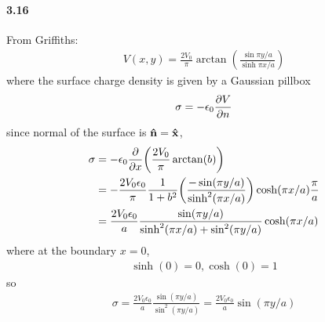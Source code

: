 \documentclass[../main.tex]{subfiles}
\begin{document}
\pagestyle{fancy}

\setcounter{section}{4}

\paragraph{3.16} 

From Griffiths:
\begin{align*}
    V(x,y) = \frac{2V_0}{\pi} \arctan(\frac{\sin\pi y/a}{\sinh\pi x/a})
\end{align*}
where the surface charge density is given by a Gaussian pillbox
\begin{align*}
    \sigma = -\epsilon_0 \pdv{V}{n}
\end{align*}
since normal of the surface is $\vu{n} = \vu{x}$,
\begin{align*}
    \sigma &= -\epsilon_0 \pdv{x} \qt(
        \frac{2V_0}{\pi} \arctan(b)
    ) \\
    &= -\frac{2V_0 \epsilon_0}{\pi} \frac{1}{1 + b^2} \qt(\frac{-\sin(\pi y/a)}{\sinh^2(\pi x/a)}) \cosh(\pi x/a) \frac{\pi}{a} \\
    &= \frac{2V_0 \epsilon_0}{a} \frac{\sin(\pi y/a)}{\sinh^2(\pi x/a) + \sin^2(\pi y/a)} \cosh(\pi x/a)
\end{align*}
where at the boundary $x = 0$,
\begin{align*}
    \sinh(0) = 0, \cosh(0) = 1
\end{align*}
so 
\begin{align*}
    \sigma = \frac{2V_0 \epsilon_0}{a} \frac{\sin(\pi y/a)}{\sin^2(\pi y/a)} = \boxed{\frac{2V_0 \epsilon_0}{a} \sin(\pi y/a)}
\end{align*}

\newpage
\end{document}
